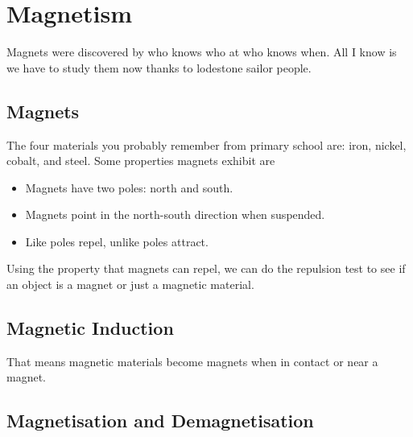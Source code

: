 \documentclass[../main.tex]{subfiles}
\begin{document}
	\section{Magnetism}
	\begin{preamb}
		Magnets were discovered by who knows who at who knows when. All I know is we have to study them now thanks to lodestone sailor people.
	\end{preamb}
	\subsection{Magnets}
	The four materials you probably remember from primary school are: iron, nickel, cobalt, and steel.
	Some properties magnets exhibit are
	\begin{itemize}
		\item Magnets have two poles: north and south.
		\item Magnets point in the north-south direction when suspended.
		\item Like poles repel, unlike poles attract.
	\end{itemize}
	Using the property that magnets can repel, we can do the repulsion test to see if an object is a magnet or just a magnetic material.
	
	\subsection{Magnetic Induction}
	That means magnetic materials become magnets when in contact or near a magnet.
	
	\subsection{Magnetisation and Demagnetisation}
\end{document}
